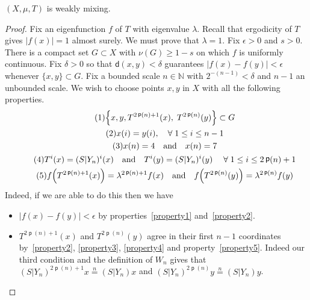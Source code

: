 \documentclass[10pt]{amsart}
\theoremstyle{definition}\newtheorem{defi}[theo]{Definition}\newtheorem{rema}[theo]{Remark}\newtheorem{exam}[theo]{Example}\newtheorem{exem}[theo]{Example}\newtheorem{nota}[theo]{Notation}
\DeclareMathOperator{\p}{\mathsf{p}}
\newcommand{\N}{\mathbb{N}}
\newcommand{\metric}{\mathsf{d}}
\let\originalleft\left
\let\originalright\right
\renewcommand{\left}{\mathopen{}\mathclose\bgroup\originalleft}
\renewcommand{\right}{\aftergroup\egroup\originalright}
\let\oldforall\forall
\renewcommand*{\forall}{\mathrel{\oldforall}}
\begin{document}
\begin{prop}
$(X,\mu,T)$ is weakly mixing.
\end{prop}
\begin{proof}
Fix an eigenfunction $f$ of $T$ with eigenvalue $\lambda$. Recall that ergodicity of $T$ gives $|f(x)| = 1$ almost surely. We must prove that $\lambda = 1$. Fix $\epsilon > 0$ and $s > 0$. There is a compact set $G \subset X$ with $\nu(G) \ge 1 - s$ on which $f$ is uniformly continuous. Fix $\delta > 0$ so that $\metric(x,y) < \delta$ guarantees $|f(x) - f(y)| < \epsilon$ whenever $\{x,y\} \subset G$. Fix a bounded scale $n \in \N$ with $2^{-(n-1)} < \delta$ and $n-1$ an unbounded scale. We wish to choose points $x,y$ in $X$ with all the following properties.
\begin{gather}
\tag{1}\label{property1} \left\{ x,y, T^{2\p(n)+1}(x),\; T^{2\p(n)}(y) \right\} \subset G\\
\tag{2}\label{property2} x(i) = y(i),\quad\forall 1 \le i \le n-1\\
\tag{3}\label{property3} x(n) = 4\quad\text{and} \quad x(n) = 7\\
\tag{4}\label{property4} T^i(x) = (S|Y_n)^i(x)\quad\text{and} \quad T^i(y) = (S|Y_n)^i(y) \quad \forall 1 \le i \le 2 \p(n)+1\\
\tag{5}\label{property5} f\left(T^{2\p(n)+1}(x)\right) = \lambda^{2 \p(n) + 1} f(x)\quad\text{and} \quad f\left(T^{2\p(n)}(y)\right) = \lambda^{2 \p(n)} f(y)
\end{gather}
Indeed, if we are able to do this then we have
\begin{itemize}
\item $|f(x) - f(y)| < \epsilon$ by properties~\eqref{property1} and~\eqref{property2}.
\item $T^{2 \p(n) + 1}(x)$ and $T^{2 \p(n)}(y)$ agree in their first $n-1$ coordinates by~\eqref{property2}, \eqref{property3}, \eqref{property4} and property~\eqref{property5}. Indeed our third condition and the definition of $W_n$ gives that $(S|Y_n)^{2\p(n)+1}x\overset{n}{=}(S|Y_n)x$ and $(S|Y_n)^{2\p(n)}y\overset{n}{=}(S|Y_n)y$.

\end{itemize}
\end{proof}
\end{document}
